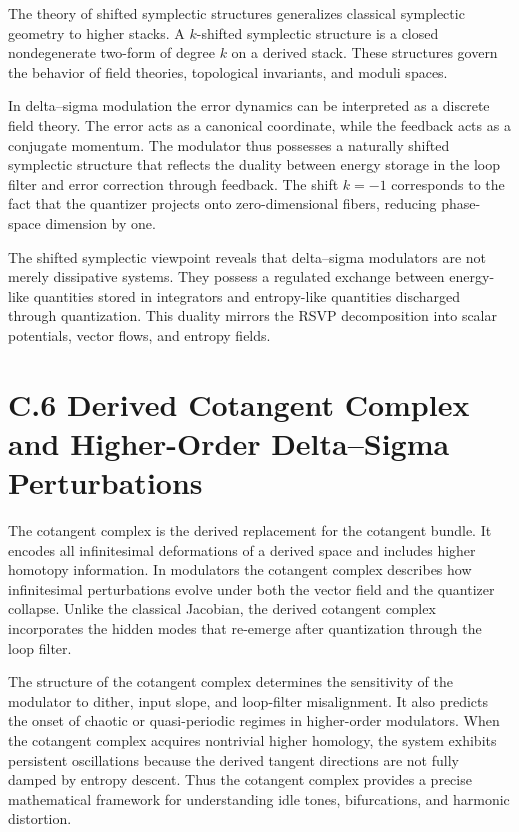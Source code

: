 The theory of shifted symplectic structures generalizes classical symplectic geometry to higher stacks. A \(k\)-shifted symplectic structure is a closed nondegenerate two-form of degree \(k\) on a derived stack. These structures govern the behavior of field theories, topological invariants, and moduli spaces.

In delta–sigma modulation the error dynamics can be interpreted as a discrete field theory. The error acts as a canonical coordinate, while the feedback acts as a conjugate momentum. The modulator thus possesses a naturally shifted symplectic structure that reflects the duality between energy storage in the loop filter and error correction through feedback. The shift \(k = -1\) corresponds to the fact that the quantizer projects onto zero-dimensional fibers, reducing phase-space dimension by one.

The shifted symplectic viewpoint reveals that delta–sigma modulators are not merely dissipative systems. They possess a regulated exchange between energy-like quantities stored in integrators and entropy-like quantities discharged through quantization. This duality mirrors the RSVP decomposition into scalar potentials, vector flows, and entropy fields.

\section{C.6 Derived Cotangent Complex and Higher-Order Delta–Sigma Perturbations}

The cotangent complex is the derived replacement for the cotangent bundle. It encodes all infinitesimal deformations of a derived space and includes higher homotopy information. In modulators the cotangent complex describes how infinitesimal perturbations evolve under both the vector field and the quantizer collapse. Unlike the classical Jacobian, the derived cotangent complex incorporates the hidden modes that re-emerge after quantization through the loop filter.

The structure of the cotangent complex determines the sensitivity of the modulator to dither, input slope, and loop-filter misalignment. It also predicts the onset of chaotic or quasi-periodic regimes in higher-order modulators. When the cotangent complex acquires nontrivial higher homology, the system exhibits persistent oscillations because the derived tangent directions are not fully damped by entropy descent. Thus the cotangent complex provides a precise mathematical framework for understanding idle tones, bifurcations, and harmonic distortion.

